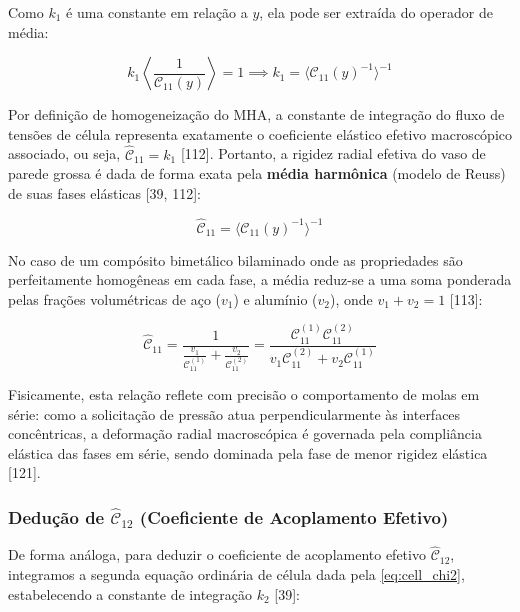 Como $k_1$ é uma constante em relação a $y$, ela pode ser extraída do operador de média:

\begin{equation}
  k_1 \left\langle \frac{1}{\mathcal{C}_{11}(y)} \right\rangle = 1 \implies k_1 = \langle \mathcal{C}_{11}(y)^{-1} \rangle^{-1}
  \label{eq:k1_sol}
\end{equation}

Por definição de homogeneização do MHA, a constante de integração do fluxo de tensões de célula representa exatamente o coeficiente elástico efetivo macroscópico associado, ou seja, $\hat{\mathcal{C}}_{11} = k_1$ [112]. Portanto, a rigidez radial efetiva do vaso de parede grossa é dada de forma exata pela \textbf{média harmônica} (modelo de Reuss) de suas fases elásticas [39, 112]:

\begin{equation}
  \hat{\mathcal{C}}_{11} = \langle \mathcal{C}_{11}(y)^{-1} \rangle^{-1}
  \label{eq:C11_eff_final}
\end{equation}

No caso de um compósito bimetálico bilaminado onde as propriedades são perfeitamente homogêneas em cada fase, a média reduz-se a uma soma ponderada pelas frações volumétricas de aço ($v_1$) e alumínio ($v_2$), onde $v_1 + v_2 = 1$ [113]:

\begin{equation}
  \hat{\mathcal{C}}_{11} = \frac{1}{\frac{v_1}{\mathcal{C}_{11}^{(1)}} + \frac{v_2}{\mathcal{C}_{11}^{(2)}}} = \frac{\mathcal{C}_{11}^{(1)} \mathcal{C}_{11}^{(2)}}{v_1 \mathcal{C}_{11}^{(2)} + v_2 \mathcal{C}_{11}^{(1)}}
  \label{eq:C11_bilaminado}
\end{equation}

Fisicamente, esta relação reflete com precisão o comportamento de molas em série: como a solicitação de pressão atua perpendicularmente às interfaces concêntricas, a deformação radial macroscópica é governada pela compliância elástica das fases em série, sendo dominada pela fase de menor rigidez elástica [121].

\subsubsection{Dedução de $\hat{\mathcal{C}}_{12}$ (Coeficiente de Acoplamento Efetivo)}

De forma análoga, para deduzir o coeficiente de acoplamento efetivo $\hat{\mathcal{C}}_{12}$, integramos a segunda equação ordinária de célula dada pela \eqref{eq:cell_chi2}, estabelecendo a constante de integração $k_2$ [39]:

